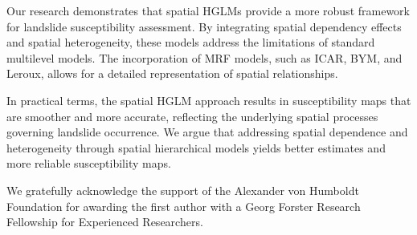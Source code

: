 \documentclass[journal abbreviation, manuscript]{copernicus}
\begin{document}
Our research demonstrates that spatial HGLMs provide a more robust framework for landslide susceptibility assessment. By integrating spatial dependency effects and spatial heterogeneity, these models address the limitations of standard multilevel models. The incorporation of MRF models, such as ICAR, BYM, and Leroux, allows for a detailed representation of spatial relationships.

In practical terms, the spatial HGLM approach results in susceptibility maps that are smoother and more accurate, reflecting the underlying spatial processes governing landslide occurrence. We argue that addressing spatial dependence and heterogeneity through spatial hierarchical models yields better estimates and more reliable susceptibility maps.




\begin{acknowledgements}
We gratefully acknowledge the support of the Alexander von Humboldt Foundation for awarding the first author with a Georg Forster Research Fellowship for Experienced Researchers.
\end{acknowledgements}




\end{document}
